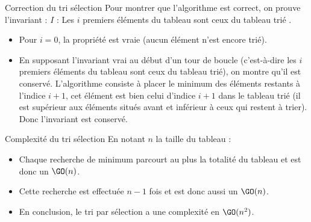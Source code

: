 \documentclass[10pt]{beamer}
\begin{document}
\begin{frame}[fragile]{\Ctitle}{\stitle}
	\begin{exampleblock}{Correction du tri sélection}
		\textcolor{OliveGreen}{Pour montrer que l'algorithme est correct, on prouve l'invariant : $I$ : \og{} Les $i$ premiers éléments du tableau sont ceux du tableau trié \fg{}.}
		\begin{itemize}
			\item<2->\textcolor{OliveGreen}{Pour $i=0$, la propriété est vraie (aucun élément n'est encore trié).}
			\item<3->\textcolor{OliveGreen}{En supposant l'invariant vrai au début d'un tour de boucle (c'est-à-dire les $i$ premiers éléments du tableau sont ceux du tableau trié), on montre qu'il est conservé. L'algorithme consiste à placer le minimum des éléments restants à l'indice $i+1$, cet élément est bien celui d'indice $i+1$ dans le tableau trié (il est supérieur aux éléments situés avant et inférieur à ceux qui restent à trier). Donc l'invariant est conservé.}
		\end{itemize}
	\end{exampleblock}
\end{frame}

\begin{frame}[fragile]{\Ctitle}{\stitle}
	\begin{exampleblock}{Complexité du tri sélection}
		En notant $n$ la taille du tableau :
		\begin{itemize}
			\item<1-> Chaque recherche de minimum parcourt au plus la totalité du tableau et est donc un $\GO(n)$.
			\item<2-> Cette recherche est effectuée $n-1$ fois et est donc aussi un $\GO(n)$.
			\item<3-> En conclusion, le tri par sélection a une complexité en $\GO(n^2)$.
		\end{itemize}
	\end{exampleblock}
\end{frame}
\end{document}
